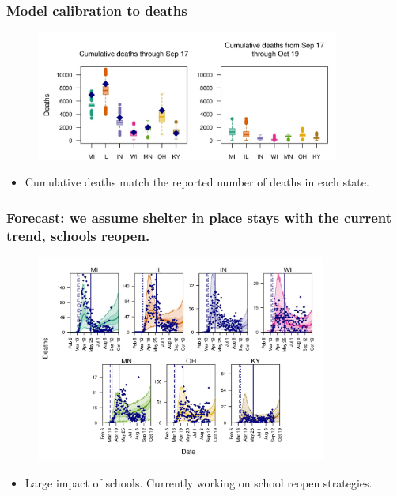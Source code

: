 \documentclass[usenames,dvipsnames]{beamer}
\begin{document}
\begin{frame}
  \frametitle{Model calibration to deaths}
  \begin{figure}
    \includegraphics[width=0.89\textwidth]{../figures/report_figure_deaths_cumulative.jpeg}
  \end{figure}
  \begin{itemize}
  \item Cumulative deaths match the reported number of deaths in each state.
  \end{itemize}    
\end{frame}

\begin{frame}
  \frametitle{Forecast: we assume shelter in place stays with the current trend, schools reopen.}
  \begin{figure}
    \includegraphics[width=0.85\textwidth]{../figures/report_figure_deaths_forecast.jpeg}
  \end{figure}
  \begin{itemize}
    \item Large impact of schools. Currently working on school reopen strategies. 
  \end{itemize}
\end{frame}
\end{document}
